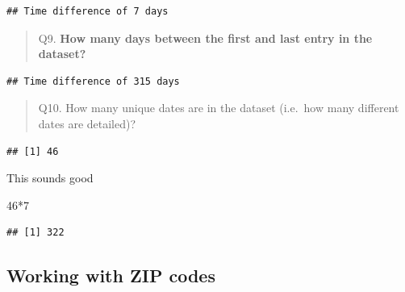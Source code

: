 \documentclass[
]{article}
\newenvironment{Shaded}{\begin{snugshade}}{\end{snugshade}}
\newcommand{\DecValTok}[1]{\textcolor[rgb]{0.00,0.00,0.81}{#1}}
\newcommand{\FunctionTok}[1]{\textcolor[rgb]{0.00,0.00,0.00}{#1}}
\newcommand{\NormalTok}[1]{#1}
\newcommand{\SpecialCharTok}[1]{\textcolor[rgb]{0.00,0.00,0.00}{#1}}
\begin{document}
\begin{verbatim}
## Time difference of 7 days
\end{verbatim}

\begin{quote}
Q9. \textbf{How many days between the first and last entry in the
dataset?}
\end{quote}

\begin{Shaded}
\end{Shaded}

\begin{verbatim}
## Time difference of 315 days
\end{verbatim}

\begin{quote}
Q10. How many unique dates are in the dataset (i.e.~how many different
dates are detailed)?
\end{quote}

\begin{Shaded}
\end{Shaded}

\begin{verbatim}
## [1] 46
\end{verbatim}

This sounds good

\begin{Shaded}
\begin{Highlighting}[]
\DecValTok{46}\SpecialCharTok{*}\DecValTok{7}
\end{Highlighting}
\end{Shaded}

\begin{verbatim}
## [1] 322
\end{verbatim}

\hypertarget{working-with-zip-codes}{%
\subsection{Working with ZIP codes}\label{working-with-zip-codes}}
\end{document}
